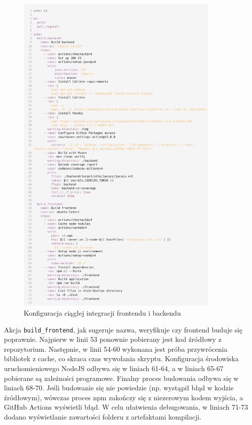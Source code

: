 \begin{figure}[h]
    \centering
    \setlength{\fboxsep}{0pt}
    \setlength{\fboxrule}{0.4pt}
    \includegraphics[width=0.88\textwidth]{chap6/carbon_example_ci.png}
    \caption{Konfiguracja ciągłej integracji frontendu i backendu}
    \label{listing:carbon_example_ci}
\end{figure}

Akcja \verb|build_frontend|, jak sugeruje nazwa, weryfikuje czy frontend buduje się poprawnie. Najpierw w linii 53 ponownie pobierany jest kod źródłowy z repozytorium. Następnie, w linii 54-60 wykonana jest próba przywrócenia bibliotek z cache, co skraca czas wywołania skryptu. Konfiguracja środowiska uruchomieniowego NodeJS odbywa się w liniach 61-64, a w liniach 65-67 pobierane są zależności programowe. Finalny proces budowania odbywa się w liniach 68-70. Jeśli budowanie się nie powiedzie (np. wystąpił błąd w kodzie źródłowym), wówczas proces npm zakończy się z niezerowym kodem wyjścia, a GitHub Actions wyświetli błąd. W celu ułatwienia debugowania, w liniach 71-73 dodano wyświetlanie zawartości folderu z artefaktami kompilacji.

